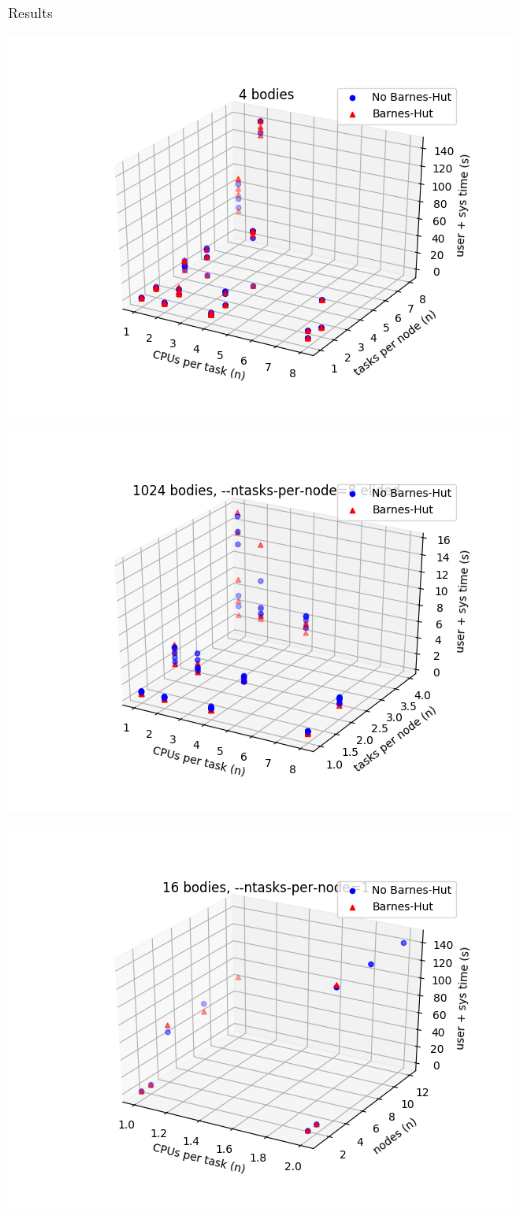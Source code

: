 \documentclass{beamer}
\begin{document}
\begin{frame}[allowframebreaks]{Results}
\framebreak

\includegraphics[width=\linewidth]{4-cpusPerTask-tasksPerNode}

\framebreak

\includegraphics[width=\linewidth]{1024-cpusPerTask-tasksPerNode-elide_8_tpn}

\framebreak

\includegraphics[width=\linewidth]{16-cpusPerTask-nodes-just_1_tpn}


\end{frame}
\end{document}
